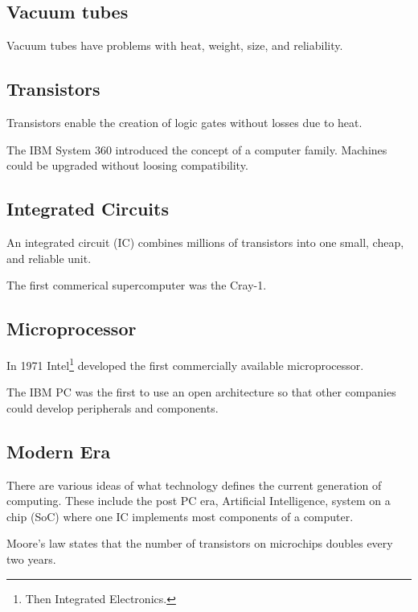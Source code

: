 \subsection{Vacuum tubes}
Vacuum tubes have problems with heat, weight, size, and reliability.

\subsection{Transistors}
Transistors enable the creation of logic gates without losses due to heat.

The IBM System 360 introduced the concept of a computer family. Machines could be upgraded without loosing compatibility.

\subsection{Integrated Circuits}
An integrated circuit (IC) combines millions of transistors into one small, cheap, and reliable unit.

The first commerical supercomputer was the Cray-1.

\subsection{Microprocessor}
In 1971 Intel\footnote{Then Integrated Electronics.} developed the first commercially available microprocessor.

The IBM PC was the first to use an open architecture so that other companies could develop peripherals and components.

\subsection{Modern Era}
There are various ideas of what technology defines the current generation of computing. These include the post PC era, Artificial Intelligence, system on a chip (SoC) where one IC implements most components of a computer.

Moore's law states that the number of transistors on microchips doubles every two years.
